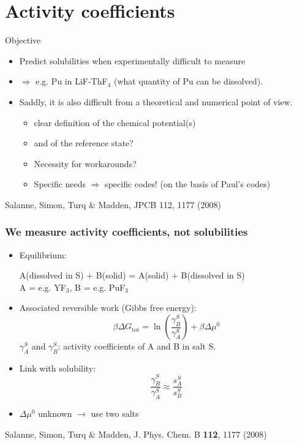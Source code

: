\documentclass{beamer}
\begin{document}
\section{Activity coefficients}
\begin{frame}{Objective}
    \begin{itemize}
        \item Predict solubilities when experimentally difficult to measure
        \item $\Rightarrow$ e.g. Pu in LiF-ThF$_4$ (what quantity of Pu can be dissolved).
        \item Saddly, it is also difficult from a theoretical and numerical point of view.
        \begin{itemize}
            \item clear definition of the chemical potential(s)
            \item and of the reference state?
            \item Necessity for workarounds?
            \item Specific needs $\Rightarrow$ specific codes! (on the basis of Paul's codes)
        \end{itemize}
    \end{itemize}
    \scriptsize{Salanne, Simon, Turq \& Madden, JPCB 112, 1177 (2008)}
\end{frame}
\begin{frame}
    \frametitle{We measure activity coefficients, not solubilities}{}
    \begin{itemize}
        \item Equilibrium:
            \begin{center}
                A(dissolved in S) + B(solid) = A(solid) + B(dissolved in S)\\
                A = e.g. YF$_3$, B = e.g. PuF$_3$
            \end{center}
        \item Associated reversible work (Gibbs free energy):
            \begin{equation}
                \beta \Delta G_\text{tot} = \ln\left(\frac{\gamma_B^S}{\gamma_A^S}\right) +\beta \Delta \mu ^0 \nonumber
            \end{equation}
            $\gamma_A^S$ and $\gamma_B^S$: activity coefficients of A and B in salt S.
        \item Link with solubility:
            \begin{equation}
                \frac{\gamma_B^S}{\gamma_A^S} \approx \frac{s_A^S}{s_B^S}   \nonumber
            \end{equation}
        \item $\Delta\mu^0$ unknown $\rightarrow$ use two salts
    \end{itemize}
    \scriptsize{Salanne, Simon, Turq \& Madden, J. Phys. Chem. B \textbf{112}, 1177 (2008)}
\end{frame}
\end{document}
